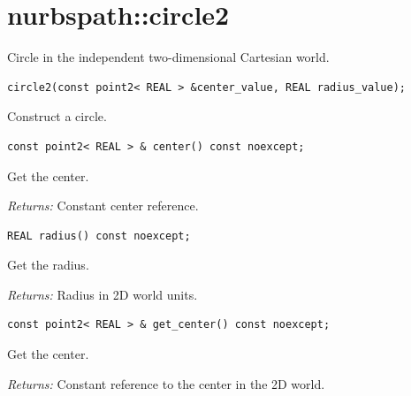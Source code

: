 \section{nurbspath::circle2}
Circle in the independent two-dimensional Cartesian world.
\par\noindent\begin{minipage}{\linewidth}
\begin{lstlisting}[style=apireference]
circle2(const point2< REAL > &center_value, REAL radius_value);
\end{lstlisting}
{\footnotesize Construct a circle.\par}
\end{minipage}\par\vspace{1pt}
\par\noindent\begin{minipage}{\linewidth}
\begin{lstlisting}[style=apireference]
const point2< REAL > & center() const noexcept;
\end{lstlisting}
{\footnotesize Get the center.\par}
{\footnotesize\textit{Returns:} Constant center reference.\par}
\end{minipage}\par\vspace{1pt}
\par\noindent\begin{minipage}{\linewidth}
\begin{lstlisting}[style=apireference]
REAL radius() const noexcept;
\end{lstlisting}
{\footnotesize Get the radius.\par}
{\footnotesize\textit{Returns:} Radius in 2D world units.\par}
\end{minipage}\par\vspace{1pt}
\par\noindent\begin{minipage}{\linewidth}
\begin{lstlisting}[style=apireference]
const point2< REAL > & get_center() const noexcept;
\end{lstlisting}
{\footnotesize Get the center.\par}
{\footnotesize\textit{Returns:} Constant reference to the center in the 2D world.\par}
\end{minipage}\par\vspace{1pt}
